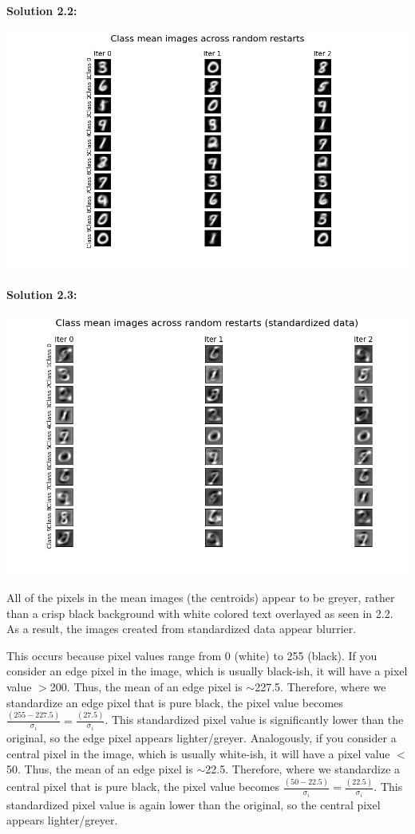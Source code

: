 \documentclass[submit]{harvardml}
\begin{document}
\noindent\textbf{Solution 2.2:}\\
\begin{center}
    \includegraphics[scale=0.6]{2.2.png}
\end{center}

\noindent\textbf{Solution 2.3:}\\
\begin{center}
    \includegraphics[scale=0.6]{2.3.png}
\end{center}
All of the pixels in the mean images (the centroids) appear to be greyer, rather than a crisp black background with white colored text overlayed as seen in 2.2. As a result, the images created from standardized data appear blurrier.

This occurs because pixel values range from 0 (white) to 255 (black). If you consider an edge pixel in the image, which is usually black-ish, it will have a pixel value $>$200. Thus, the mean of an edge pixel is $\sim$227.5. Therefore, where we standardize an edge pixel that is pure black, the pixel value becomes $\frac{(255 - 227.5)}{\sigma_i} = \frac{(27.5)}{\sigma_i}$. This standardized pixel value is significantly lower than the original, so the edge pixel appears lighter/greyer. Analogously, if you consider a central pixel in the image, which is usually white-ish, it will have a pixel value $<$50. Thus, the mean of an edge pixel is $\sim$22.5. Therefore, where we standardize a central pixel that is pure black, the pixel value becomes $\frac{(50 - 22.5)}{\sigma_i} = \frac{(22.5)}{\sigma_i}$. This standardized pixel value is again lower than the original, so the central pixel appears lighter/greyer.
\end{document}
